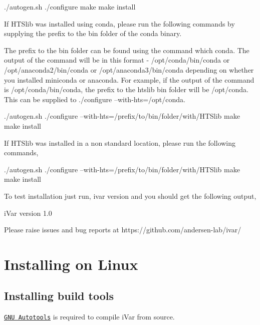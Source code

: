 \begin{DoxyCode}
./autogen.sh
./configure
make
make install
\end{DoxyCode}


If H\+T\+Slib was installed using conda, please run the following commands by supplying the prefix to the bin folder of the conda binary.

The prefix to the bin folder can be found using the command {\ttfamily which conda}. The output of the command will be in this format -\/ /opt/conda/bin/conda or /opt/anaconda2/bin/conda or /opt/anaconda3/bin/conda depending on whether you installed miniconda or anaconda. For example, if the output of the command is /opt/conda/bin/conda, the prefix to the htslib bin folder will be /opt/conda. This can be supplied to ./configure --with-\/hts=/opt/conda.


\begin{DoxyCode}
./autogen.sh
./configure --with-hts=/prefix/to/bin/folder/with/HTSlib
make
make install
\end{DoxyCode}


If H\+T\+Slib was installed in a non standard location, please run the following commands,


\begin{DoxyCode}
./autogen.sh
./configure --with-hts=/prefix/to/bin/folder/with/HTSlib
make
make install
\end{DoxyCode}


To test installation just run, {\ttfamily ivar version} and you should get the following output,


\begin{DoxyCode}
iVar version 1.0

Please raise issues and bug reports at https://github.com/andersen-lab/ivar/
\end{DoxyCode}
\hypertarget{installpage_autotoc_md5}{}\section{Installing on Linux}\label{installpage_autotoc_md5}
\hypertarget{installpage_autotoc_md6}{}\subsection{Installing build tools}\label{installpage_autotoc_md6}
\href{https://www.gnu.org/software/automake/manual/html_node/Autotools-Introduction.html#Autotools-Introduction}{\tt G\+NU Autotools} is required to compile i\+Var from source.

